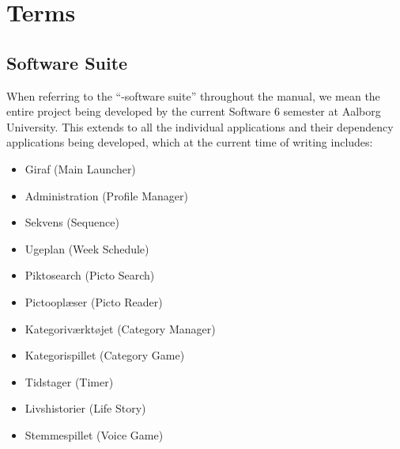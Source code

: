 
\chapter{Terms}

\section{\giraf Software Suite}
\noindent When referring to the ``\giraf-software suite'' throughout the manual, we mean the entire \giraf project being developed by the current Software 6 semester at Aalborg University. This extends to all the individual applications and their dependency applications being developed, which at the current time of writing includes: 

\begin{itemize}
    \item Giraf (Main Launcher)
    \item Administration (Profile Manager)
    \item Sekvens (Sequence)
    \item Ugeplan (Week Schedule)
    \item Piktosearch (Picto Search)
    \item Pictooplæser (Picto Reader)
    \item Kategoriværktøjet (Category Manager)
    \item Kategorispillet (Category Game)
    \item Tidstager (Timer)
    \item Livshistorier (Life Story)
    \item Stemmespillet (Voice Game)
\end{itemize}